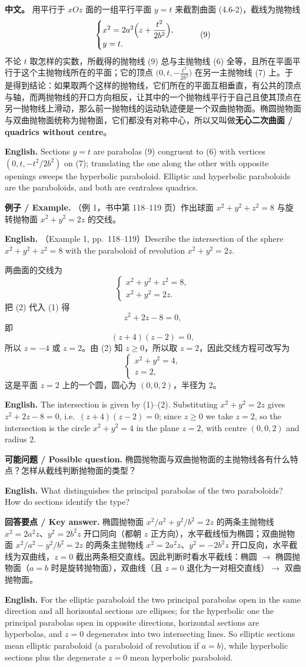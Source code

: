 \documentclass[UTF8,11pt,a4paper]{ctexart}
\newcommand{\APS}[2]{\par\noindent\textbf{中文。} #1\par\noindent\textbf{English.} #2\par\smallskip}
\newcommand{\EN}[1]{\par\noindent \textbf{English.} #1\par}
\newcommand{\EX}[2]{\par\noindent \textbf{例子 / Example.} #1\par\EN{#2}}
\newcommand{\ASK}[4]{\par\noindent \textbf{可能问题 / Possible question.} #1\par\EN{#2}\noindent \textbf{回答要点 / Key answer.} #3\par\EN{#4}\medskip}
\theoremstyle{definition}
\begin{document}
\APS{用平行于 $xOz$ 面的一组平行平面 $y=t$ 来截割曲面 (4.6-2)，截线为抛物线
\[
\begin{cases}x^2=2a^2\Bigl(z+\dfrac{t^2}{2b^2}\Bigr),\\ y=t.\end{cases}\tag{9}
\]
不论 $t$ 取怎样的实数，所截得的抛物线 (9) 总与主抛物线 (6) 全等，且所在平面平行于这个主抛物线所在的平面；它的顶点 $\bigl(0,t,-\frac{t^2}{2b^2}\bigr)$ 在另一主抛物线 (7) 上。于是得到结论：如果取两个这样的抛物线，它们所在的平面互相垂直，有公共的顶点与轴，而两抛物线的开口方向相反，让其中的一个抛物线平行于自己且使其顶点在另一抛物线上滑动，那么前一抛物线的运动轨迹便是一个双曲抛物面。椭圆抛物面与双曲抛物面统称为抛物面，它们都没有对称中心，所以又叫做\textbf{无心二次曲面 / quadrics without centre}。}{Sections $y=t$ are parabolas (9) congruent to (6) with vertices $(0,t,-t^2/2b^2)$ on (7); translating the one along the other with opposite openings sweeps the hyperbolic paraboloid. Elliptic and hyperbolic paraboloids are the paraboloids, and both are centraless quadrics.}

\EX{（例 1，书中第 118--119 页）作出球面 $x^2+y^2+z^2=8$ 与旋转抛物面 $x^2+y^2=2z$ 的交线。}{（Example 1, pp.~118--119）Describe the intersection of the sphere $x^2+y^2+z^2=8$ with the paraboloid of revolution $x^2+y^2=2z$.}
两曲面的交线为
\[
\begin{cases}x^2+y^2+z^2=8,\\ x^2+y^2=2z.\end{cases}\tag{1--2}
\]
把 (2) 代入 (1) 得
\[
z^2+2z-8=0,
\]
即
\[
(z+4)(z-2)=0,
\]
所以 $z=-4$ 或 $z=2$。由 (2) 知 $z\ge 0$，所以取 $z=2$，因此交线方程可改写为
\[
\begin{cases}x^2+y^2=4,\\ z=2,\end{cases}
\]
这是平面 $z=2$ 上的一个圆，圆心为 $(0,0,2)$，半径为 $2$。
\EN{The intersection is given by (1)--(2). Substituting $x^2+y^2=2z$ gives $z^2+2z-8=0$, i.e.\ $(z+4)(z-2)=0$; since $z\ge0$ we take $z=2$, so the intersection is the circle $x^2+y^2=4$ in the plane $z=2$, with centre $(0,0,2)$ and radius $2$.}

\ASK{椭圆抛物面与双曲抛物面的主抛物线各有什么特点？怎样从截线判断抛物面的类型？}{What distinguishes the principal parabolas of the two paraboloids? How do sections identify the type?}{椭圆抛物面 $x^2/a^2+y^2/b^2=2z$ 的两条主抛物线 $x^2=2a^2z$、$y^2=2b^2z$ 开口同向（都朝 $z$ 正方向），水平截线恒为椭圆；双曲抛物面 $x^2/a^2-y^2/b^2=2z$ 的两条主抛物线 $x^2=2a^2z$、$y^2=-2b^2z$ 开口反向，水平截线为双曲线，$z=0$ 截出两条相交直线。因此判断时看水平截线：椭圆 $\to$ 椭圆抛物面（$a=b$ 时是旋转抛物面），双曲线（且 $z=0$ 退化为一对相交直线）$\to$ 双曲抛物面。}{For the elliptic paraboloid the two principal parabolas open in the same direction and all horizontal sections are ellipses; for the hyperbolic one the principal parabolas open in opposite directions, horizontal sections are hyperbolas, and $z=0$ degenerates into two intersecting lines. So elliptic sections mean elliptic paraboloid (a paraboloid of revolution if $a=b$), while hyperbolic sections plus the degenerate $z=0$ mean hyperbolic paraboloid.}
\end{document}
